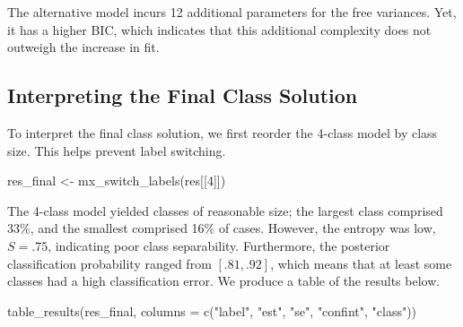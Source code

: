 \documentclass[
  man,floatsintext]{apa6}
\newenvironment{Shaded}{\begin{snugshade}}{\end{snugshade}}
\newcommand{\AttributeTok}[1]{\textcolor[rgb]{0.77,0.63,0.00}{#1}}
\newcommand{\DecValTok}[1]{\textcolor[rgb]{0.00,0.00,0.81}{#1}}
\newcommand{\FunctionTok}[1]{\textcolor[rgb]{0.00,0.00,0.00}{#1}}
\newcommand{\NormalTok}[1]{#1}
\newcommand{\OtherTok}[1]{\textcolor[rgb]{0.56,0.35,0.01}{#1}}
\newcommand{\StringTok}[1]{\textcolor[rgb]{0.31,0.60,0.02}{#1}}
\begin{document}
The alternative model incurs 12 additional parameters for the free variances.
Yet, it has a higher BIC, which indicates that this additional complexity does not outweigh the increase in fit.

\hypertarget{interpreting-the-final-class-solution}{%
\subsection{Interpreting the Final Class Solution}\label{interpreting-the-final-class-solution}}

To interpret the final class solution,
we first reorder the 4-class model by class size.
This helps prevent label switching.

\begin{Shaded}
\begin{Highlighting}[]
\NormalTok{res\_final }\OtherTok{\textless{}{-}} \FunctionTok{mx\_switch\_labels}\NormalTok{(res[[}\DecValTok{4}\NormalTok{]])}
\end{Highlighting}
\end{Shaded}

The 4-class model yielded classes of reasonable size;
the largest class comprised 33\%,
and the smallest comprised 16\% of cases.
However, the entropy was low, \(S = .75\), indicating poor class separability.
Furthermore, the posterior classification probability ranged from \([.81, .92]\), which means that at least some classes had a high classification error.
We produce a table of the results below.

\begin{Shaded}
\begin{Highlighting}[]
\FunctionTok{table\_results}\NormalTok{(res\_final, }\AttributeTok{columns =} \FunctionTok{c}\NormalTok{(}\StringTok{"label"}\NormalTok{, }\StringTok{"est"}\NormalTok{, }\StringTok{"se"}\NormalTok{, }\StringTok{"confint"}\NormalTok{,}
    \StringTok{"class"}\NormalTok{))}
\end{Highlighting}
\end{Shaded}
\end{document}
